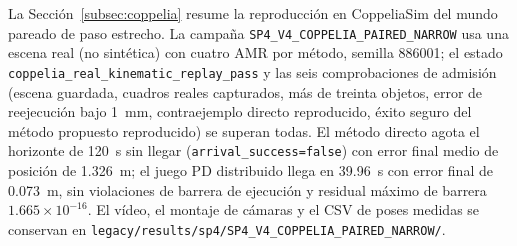 La Sección~\ref{subsec:coppelia} resume la reproducción en CoppeliaSim del
mundo pareado de paso estrecho. La campaña \texttt{SP4\_V4\_COPPELIA\_PAIRED\_NARROW}
usa una escena real (no sintética) con cuatro AMR por método, semilla 886001;
el estado \texttt{coppelia\_real\_kinematic\_replay\_pass} y las seis
comprobaciones de admisión (escena guardada, cuadros reales capturados, más de
treinta objetos, error de reejecución bajo 1~mm, contraejemplo directo
reproducido, éxito seguro del método propuesto reproducido) se superan todas.
El método directo agota el horizonte de 120~s sin llegar
(\texttt{arrival\_success=false}) con error final medio de posición de
1.326~m; el juego PD distribuido llega en 39.96~s con error final de 0.073~m,
sin violaciones de barrera de ejecución y residual máximo de barrera
$1.665\times10^{-16}$. El vídeo, el montaje de cámaras y el CSV de poses
medidas se conservan en \texttt{legacy/results/sp4/SP4\_V4\_COPPELIA\_PAIRED\_NARROW/}.
